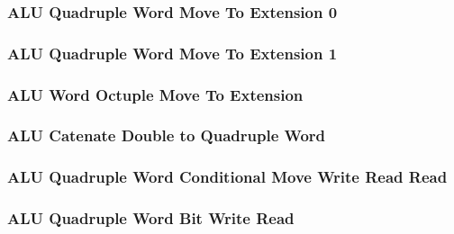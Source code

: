 

\subsubsection[{\small ALU Quadruple Word Move To Extension 0}]{ALU Quadruple Word Move To Extension 0} \label{sec:format-ALU-XMOVETQ0}



\subsubsection[{\small ALU Quadruple Word Move To Extension 1}]{ALU Quadruple Word Move To Extension 1} \label{sec:format-ALU-XMOVETQ1}



\subsubsection[{\small ALU Word Octuple Move To Extension}]{ALU Word Octuple Move To Extension} \label{sec:format-ALU-XMOVETO}



\subsubsection[{\small ALU Catenate Double to Quadruple Word}]{ALU Catenate Double to Quadruple Word} \label{sec:format-ALU-CATDQ}



\subsubsection[{\small ALU Quadruple Word Conditional Move Write Read Read}]{ALU Quadruple Word Conditional Move Write Read Read} \label{sec:format-ALU-QCMWRR}



\subsubsection[{\small ALU Quadruple Word Bit Write Read}]{ALU Quadruple Word Bit Write Read} \label{sec:format-ALU-QBWR}

